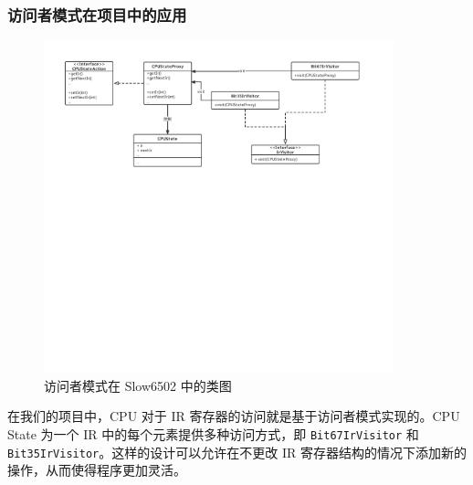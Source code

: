 \subsubsection{访问者模式在项目中的应用}

\begin{figure}[h]
  \centering
  \includegraphics[width=0.9\textwidth]{figures/Visitor.pdf}
  \caption{访问者模式在 Slow6502 中的类图}
\end{figure}

在我们的项目中，CPU 对于 IR 寄存器的访问就是基于访问者模式实现的。CPU State 为一个 IR 中的每个元素提供多种访问方式，即 \lstinline{Bit67IrVisitor} 和 \lstinline{Bit35IrVisitor}。这样的设计可以允许在不更改 IR 寄存器结构的情况下添加新的操作，从而使得程序更加灵活。
